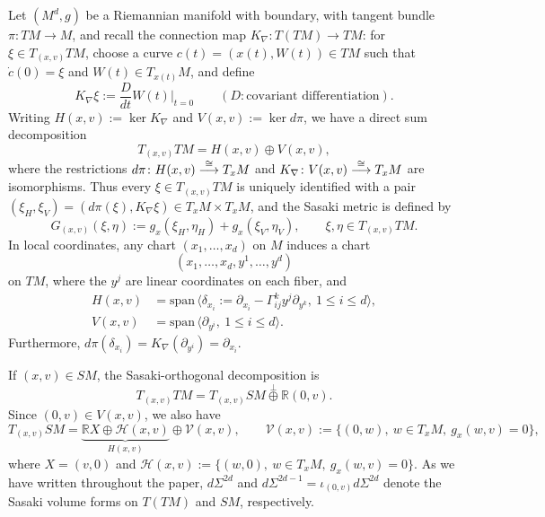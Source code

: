 \documentclass[11pt]{article}
\def\To#1{\mathchoice{\xrightarrow{\textstyle\kern4pt#1\kern3pt}}{\stackrel{#1}{\longrightarrow}}{}{}}
\theoremstyle{plain}
\theoremstyle{definition}
\theoremstyle{remark}
\def\Rm{{\mathbb{R}}}
\def\H{\mathcal{H}}
\def\V{\mathcal{V}}
\begin{document}
Let $(M^d,g)$ be a Riemannian manifold with boundary, with tangent bundle $\pi\colon TM \to M$, and recall
the connection map $K_\nabla\colon T(TM) \to TM$: for $\xi\in T_{(x,v)} TM$, choose a curve $c(t) = (x(t),W(t)) \in TM$
such that $\dot c(0) = \xi$ and $W(t) \in T_{x(t)} M$, and define
\begin{equation*}
K_\nabla \xi := \frac{D}{dt} W(t)|_{t=0} \qquad (D:\text{covariant differentiation}).
\end{equation*}
Writing $H(x,v) := \ker K_\nabla$ and $V(x,v) := \ker d\pi$, we have a direct sum decomposition
\begin{equation*}
T_{(x,v)} TM = H(x,v)\oplus V(x,v),
\end{equation*}
where the restrictions $d\pi \colon H(x,v) \To{\cong}T_x M$ and $K_\nabla\colon V(x,v)
\To{\cong} T_x M$ are isomorphisms. Thus every $\xi\in T_{(x,v)} TM$ is uniquely
identified with a pair $(\xi_H,\xi_V) = (d\pi(\xi), K_\nabla \xi) \in T_xM \times T_x M$, and the Sasaki metric is defined by
\begin{equation*}
G_{(x,v)} (\xi,\eta) := g_x(\xi_H, \eta_H) + g_x(\xi_V,\eta_V), \qquad \xi,\eta\in T_{(x,v)}TM.
\end{equation*}
In local coordinates, any chart $(x_1,\dots,x_d)$ on $M$ induces a chart
\[
(x_1,\dots,x_d, y^1,\dots,y^d)
\]
on $TM$, where the $y^j$ are linear coordinates on each fiber, and
\begin{align*}
H(x,v) &= \mathrm{span}\, \bigl\langle \delta_{x_i} := \partial_{x_i} - \Gamma_{ij}^k y^j \partial_{y^k},\ 1\le i\le d\bigr\rangle, \\
V(x,v) &= \mathrm{span}\, \bigl\langle \partial_{y^i},\ 1\le i\le d\bigr\rangle.
\end{align*}
Furthermore, $d\pi (\delta_{x_i}) = K_\nabla (\partial_{y^i}) = \partial_{x_i}$.

If $(x,v)\in SM$, the Sasaki-orthogonal decomposition is
\begin{equation*}
T_{(x,v)} TM = T_{(x,v)} SM \stackrel{\perp}{\oplus} \Rm (0,v).
\end{equation*}
Since $(0,v)\in V(x,v)$, we also have
\begin{equation*}
T_{(x,v)} SM = \underbrace{\Rm X \oplus \H(x,v)}_{H(x,v)} \oplus \V(x,v), \qquad \V(x,v) := \{(0,w),\ w\in T_xM,\ g_x(w,v) = 0\},
\end{equation*}
where $X = (v,0)$ and $\H(x,v) := \{(w,0),\ w\in T_xM,\ g_x(w,v) = 0\}$. As we have written throughout the paper, $d\Sigma^{2d}$
and $d\Sigma^{2d-1} = \iota_{(0,v)} d\Sigma^{2d}$ denote the Sasaki volume forms on $T(TM)$ and $SM$, respectively.
\end{document}
